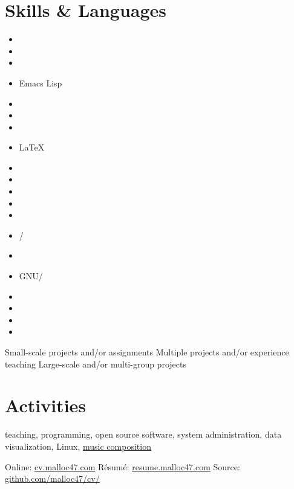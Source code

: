 \documentclass[10pt]{article}
\begin{document}
\begin{minipage}{\linewidth}
\newcommand{\skills}[2]{
  \item #2 #1
}
\section{Skills \& Languages}
\begin{multicols}{4}
\raggedcolumns
\begin{itemize}
\renewcommand{\labelitemi}{}
\renewcommand{\skill}{\textnormal}
\setlength{\itemsep}{1pt}
\setlength{\parskip}{0pt}
\setlength{\parsep}{0pt}

\skills{\bash}{\threeskill}
\skills{\ccpp}{\threeskill}
\skills{\clojure}{\threeskill}
\skills{Emacs Lisp}{\twoskill}
\skills{\haskell}{\oneskill}
\skills{\java}{\threeskill}
\skills{\js}{\twoskill}
\skills{\LaTeX}{\twoskill}
\skills{\python}{\threeskill}
\skills{\scheme}{\threeskill}
\skills{\matlab}{\twoskill}

\skills{\django}{\twoskill}
\skills{\git}{\threeskill}
\skills{\numpy/\scipy}{\threeskill}
\skills{\opencv}{\threeskill}

\skills{GNU/\linux}{\threeskill}
\skills{\hadoop}{\threeskill}
\skills{\hive}{\oneskill}
\skills{\postgres}{\threeskill}
\skills{\spark}{\threeskill}



\end{itemize}
\end{multicols}
\begin{footnotesize}
  \oneskill Small-scale projects and/or assignments \hfill
  \twoskill Multiple projects and/or experience teaching \hfill
  \threeskill Large-scale and/or multi-group projects
\end{footnotesize}
\end{minipage}

\section{Activities}
teaching, programming, open source software, system administration,
data visualization, Linux,
\href{https://soundcloud.com/malloc47}{music composition}

\null\vfill
\footnotesize{
  Online:  \href{http://cv.malloc47.com}{cv.malloc47.com} \hfill
  Résumé: \href{http://resume.malloc47.com}{resume.malloc47.com} \hfill
  Source:  \href{https://github.com/malloc47/cv/tree/master}{github.com/malloc47/cv/}
}

\end{document}
